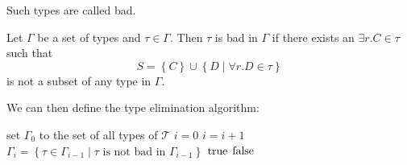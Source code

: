 Such types are called bad.

\begin{definition}
	Let $\Gamma$ be a set of types and $\tau \in \Gamma$.
	Then $\tau$ is bad in $\Gamma$ if there exists an $\exists r.C \in \tau$ such that
	\[
		S = \left\{ C \right\} \cup \left\{ D \mid \forall r.D \in \tau \right\}
	\]
	is not a subset of any type in $\Gamma$.
\end{definition}

We can then define the type elimination algorithm:
\begin{algorithm}[H]
	\caption{$\mathcal{ALC}\func{-Elim}(A_0, \mathcal{T})$}
	\begin{algorithmic}[1]
		\State set $\Gamma_0$ to the set of all types of $\mathcal{T}$ 
		\State $i = 0$
		\Repeat
		\State $i = i + 1$
		\State $\Gamma_i = \left\{ \tau \in \Gamma_{i-1} \mid \tau \text{ is not bad in } \Gamma_{i-1} \right\}$
		\Return $\mathit{\text{true}}$
		\Else{}
		\Return $\mathit{\text{false}}$
		\EndIf
	\end{algorithmic}
\end{algorithm}

